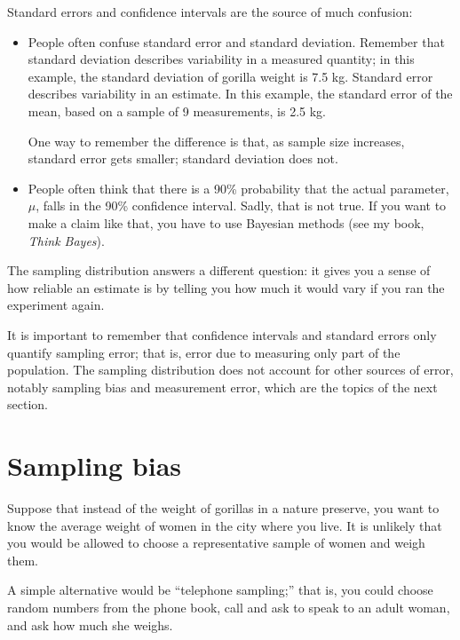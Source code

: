 \documentclass[12pt]{book}
\begin{document}
Standard errors and confidence intervals are the source of much confusion:

\begin{itemize}

\item People often confuse standard error and standard deviation.
  Remember that standard deviation describes variability in a measured
  quantity; in this example, the standard deviation of gorilla weight
  is 7.5 kg.  Standard error describes variability in an estimate.  In
  this example, the standard error of the mean, based on a sample of 9
  measurements, is 2.5 kg.

One way to remember the difference is that, as sample size increases,
standard error gets smaller; standard deviation does not.

\item People often think that there is a 90\% probability that the
  actual parameter, $\mu$, falls in the 90\% confidence interval.
  Sadly, that is not true.  If you want to make a claim like that, you
  have to use Bayesian methods (see my book, {\it Think Bayes}).

\end{itemize}

The sampling distribution answers a different question:
it gives you a sense of how reliable an estimate
is by telling you how much it would vary if you ran the experiment
again.

It is important to remember that confidence intervals
and standard errors only quantify sampling error; that is,
error due to measuring only part of the population.
The sampling distribution does not account for other
sources of error, notably sampling bias and measurement error, 
which are the topics of the next section.


\section{Sampling bias}

Suppose that instead of the weight of gorillas in a nature preserve,
you want to know the average weight of women in the city where you
live.  It is unlikely that you would be allowed
to choose a representative sample of women and
weigh them.

A simple alternative would be
``telephone sampling;'' that is,
you could choose random numbers from the phone book, call and ask to
speak to an adult woman, and ask how much she weighs.
\end{document}
